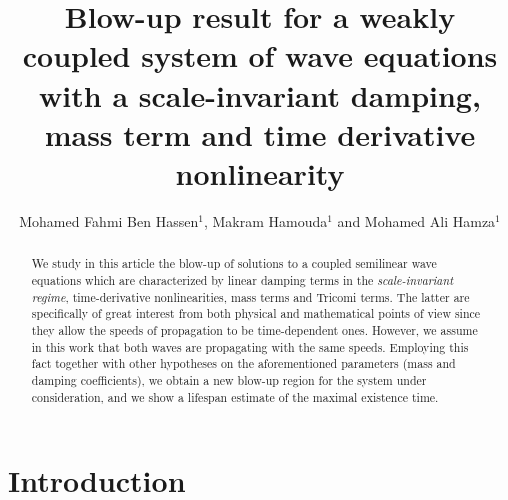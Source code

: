 \documentclass[12pt,leqno]{amsart}
\date{}
\numberwithin{equation}{section}
\theoremstyle{remark}
\begin{document}
\title[Blow-up result for a weakly coupled system of wave  equations]{Blow-up result for a weakly coupled system of wave  equations with  a scale-invariant damping, mass term  and time derivative nonlinearity}
\author[M.F. Ben Hassen, M. Hamouda and M. A. Hamza]{Mohamed Fahmi Ben Hassen$^{1}$, Makram Hamouda$^{1}$ and Mohamed Ali Hamza$^{1}$}
\address{$^{1}$  Department of Basic Sciences, Deanship of Preparatory Year and Supporting Studies, Imam Abdulrahman Bin Faisal University, P. O. Box 1982, Dammam, Saudi Arabia.}



\medskip





\pagestyle{plain}


\maketitle


\begin{abstract}
We study in this article   the blow-up of solutions to a coupled semilinear wave equations which are characterized by  linear damping terms in the \textit{scale-invariant regime}, time-derivative nonlinearities, mass terms and Tricomi terms. The latter are specifically of great interest from both physical and mathematical points of view since they allow the  speeds of propagation to be time-dependent ones. However, we assume in this work that both waves are propagating with the same speeds.  Employing this fact together with other hypotheses on the aforementioned parameters (mass and damping coefficients), we obtain a new blow-up region for the system under consideration, and we show a lifespan estimate of the maximal existence time.
\end{abstract}


\section{Introduction}
\par\quad
\end{document}
